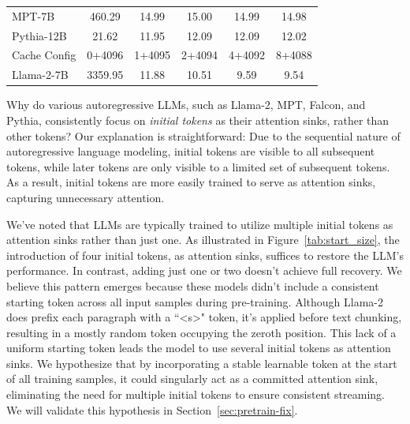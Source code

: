 \documentclass{article} \usepackage{iclr2024_conference,times}
\begin{document}
\begin{minipage}[t]{\textwidth}
\begin{minipage}[t]{0.57\textwidth}
\begin{tabular}{lccccc}
MPT-7B     & 460.29                              & 14.99                      & 15.00                      & 14.99                      & 14.98                       \\
Pythia-12B & 21.62                               & 11.95                      & 12.09                      & 12.09                      & 12.02                       \\
\midrule
\midrule
Cache Config  & 0+4096 & 1+4095 & 2+4094 & 4+4092 & 8+4088 \\
\midrule
Llama-2-7B & 3359.95                             & 11.88                      & 10.51                      & 9.59                       & 9.54                     \\
\bottomrule
\end{tabular}
  \end{minipage}
\end{minipage}
 Why do various autoregressive LLMs, such as Llama-2, MPT, Falcon, and Pythia, consistently focus on \textit{initial tokens} as their attention sinks, rather than other tokens? Our explanation is straightforward: Due to the sequential nature of autoregressive language modeling, initial tokens are visible to all subsequent tokens, while later tokens are only visible to a limited set of subsequent tokens. As a result, initial tokens are more easily trained to serve as attention sinks, capturing unnecessary attention.

We've noted that LLMs are typically trained to utilize multiple initial tokens as attention sinks rather than just one. As illustrated in Figure~\ref{tab:start_size}, the introduction of four initial tokens, as attention sinks, suffices to restore the LLM's performance. In contrast, adding just one or two doesn't achieve full recovery. We believe this pattern emerges because these models didn't include a consistent starting token across all input samples during pre-training. Although Llama-2 does prefix each paragraph with a ``<s>" token, it's applied before text chunking, resulting in a mostly random token occupying the zeroth position. This lack of a uniform starting token leads the model to use several initial tokens as attention sinks. We hypothesize that by incorporating a stable learnable token at the start of all training samples, it could singularly act as a committed attention sink, eliminating the need for multiple initial tokens to ensure consistent streaming. We will validate this hypothesis in Section~\ref{sec:pretrain-fix}.

\vspace{-1em}
\end{document}
